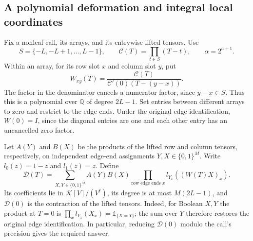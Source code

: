 \subsection{A polynomial deformation and integral local coordinates}
\label{subsec:tensor-deformation}

Fix a nonleaf call, its arrays, and its entrywise lifted tensors.
Use
\[
 S=\{-L,-L+1,\ldots,L-1\},\qquad
 \mathcal C(T)=\prod_{t\in S}(T-t),\qquad \alpha=2^{a+1}.
\]
Within an array, for its row slot $x$ and column slot $y$, put
\begin{equation}\label{eq:tensor-polynomial-matrix}
 W_{xy}(T)=\frac{\mathcal C(T)}
                  {\mathcal C'(0)(T-(y-x))}.
\end{equation}
The factor in the denominator cancels a numerator factor, since
$y-x\in S$.  Thus this is a polynomial over $\mathbb Q$ of degree
$2L-1$.  Set entries between different arrays to zero and restrict
to the edge ends.  Under the original edge identification,
$W(0)=I$, since the diagonal entries are one and each other entry has
an uncancelled zero factor.

Let $A(Y)$ and $B(X)$ be the products of the lifted row and column
tensors, respectively, on independent edge-end assignments
$Y,X\in\{0,1\}^M$.  Write $l_0(z)=1-z$ and $l_1(z)=z$.  Define
\begin{equation}\label{eq:tensor-deformed-contraction}
 \mathcal D(T)=\sum_{X,Y\in\{0,1\}^M} A(Y)B(X)
                  \prod_{\text{row edge ends }x}l_{Y_x}((W(T)X)_x).
\end{equation}
Its coefficients lie in $\mathcal K[V]/(V^\ell)$, its degree is at
most $M(2L-1)$, and $\mathcal D(0)$ is the contraction of the lifted tensors.
Indeed, for Boolean $X,Y$ the product at $T=0$ is
$\prod_x l_{Y_x}(X_x)=\mathds{1}_{\{X=Y\}}$; the sum over $Y$
therefore restores the original edge identification.
In particular, reducing $\mathcal D(0)$ modulo the call's precision gives
the required answer.

